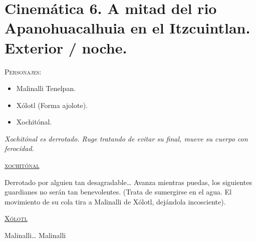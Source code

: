 \section{Cinemática 6. A mitad del rio Apanohuacalhuia en el Itzcuintlan.  Exterior / noche.} \label{Cin:Cinematica06}
 \textsc{Personajes}:

\begin{itemize}
	\item Malinalli Tenelpan.
	\item Xólotl (Forma ajolote).
	\item Xochitónal.
\end{itemize}

\textit{Xochitónal es derrotado. Ruge tratando de evitar su final, mueve su cuerpo con ferocidad. }

\begin{center}
\textsc{\underline{xochitónal}}
\\
\par
Derrotado por alguien tan desagradable… Avanza mientras puedas, los siguientes guardianes no serán tan benevolentes. (Trata de sumergirse en el agua. El movimiento de su cola tira a Malinalli de Xólotl, dejándola incosciente).
\\
\par
\textsc{\underline{Xólotl}}
\\
\par
Malinalli… Malinalli
\end{center}
